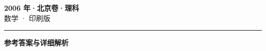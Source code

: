 \documentclass[zihao=5, a4paper]{ctexart}
\begin{document}
\begin{center}
  {\Large\bfseries 2006 年·北京卷·理科}\\[4pt]
  {\large 数学 · 印刷版}
\end{center}
\medskip
{}

\par\bigskip\hrule\bigskip
{}
\begin{center}{\large\bfseries 参考答案与详细解析}\end{center}
\smallskip

\end{document}
